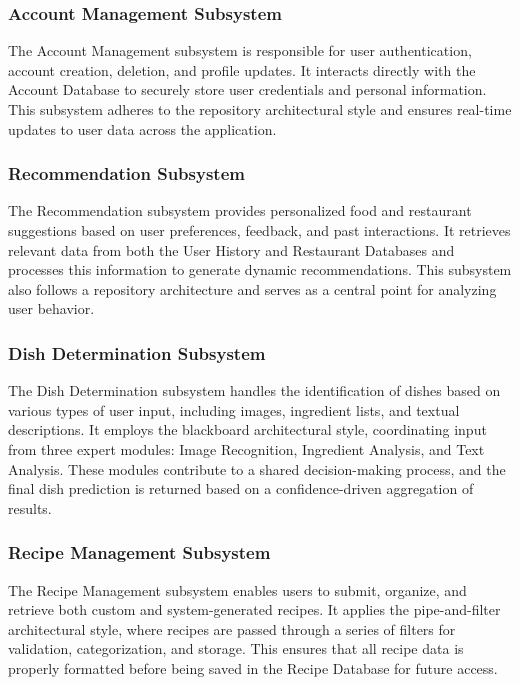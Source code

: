 \documentclass[]{article}
\begin{document}
\subsubsection{Account Management Subsystem}
The Account Management subsystem is responsible for user authentication, account creation, deletion, and profile updates. It interacts directly with the Account Database to securely store user credentials and personal information. This subsystem adheres to the repository architectural style and ensures real-time updates to user data across the application.

\subsubsection{Recommendation Subsystem}
The Recommendation subsystem provides personalized food and restaurant suggestions based on user preferences, feedback, and past interactions. It retrieves relevant data from both the User History and Restaurant Databases and processes this information to generate dynamic recommendations. This subsystem also follows a repository architecture and serves as a central point for analyzing user behavior.

\subsubsection{Dish Determination Subsystem}
The Dish Determination subsystem handles the identification of dishes based on various types of user input, including images, ingredient lists, and textual descriptions. It employs the blackboard architectural style, coordinating input from three expert modules: Image Recognition, Ingredient Analysis, and Text Analysis. These modules contribute to a shared decision-making process, and the final dish prediction is returned based on a confidence-driven aggregation of results.

\subsubsection{Recipe Management Subsystem}
The Recipe Management subsystem enables users to submit, organize, and retrieve both custom and system-generated recipes. It applies the pipe-and-filter architectural style, where recipes are passed through a series of filters for validation, categorization, and storage. This ensures that all recipe data is properly formatted before being saved in the Recipe Database for future access.
\end{document}
